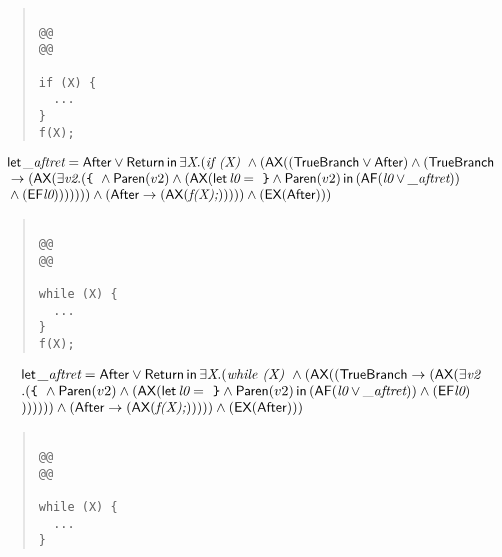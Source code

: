 \documentclass{article}
\newcommand{\AX}{\mbox{\sf{AX}}}
\newcommand{\EX}{\mbox{\sf{EX}}}
\newcommand{\AF}{\mbox{\sf{AF}}}
\newcommand{\EF}{\mbox{\sf{EF}}}
\newcommand{\mita}[1]{\mbox{\it{{#1}}}}
\newcommand{\msf}[1]{\mbox{\sf{{#1}}}}
\newcommand{\ttlb}{\mbox{\tt \char'173}}
\newcommand{\ttrb}{\mbox{\tt \char'175}}
\begin{document}
\begin{quote}\begin{verbatim}

@@
@@

if (X) {
  ...
}
f(X);
\end{verbatim}\end{quote}

\[\begin{array}{l}
\mita{\sf{let}} \, \mita{\_aftret} = \msf{After} \vee \msf{Return} \, \mita{\sf{in}} \, \exists \mita{X} . (\mita{if (X) } \wedge (\AX((\msf{TrueBranch} \vee \msf{After}) \wedge (\msf{TrueBranch}\\\mbox{} \rightarrow (\AX(\exists \mita{v2} . (\mita{{\ttlb}
  } \wedge \msf{Paren}(v2) \wedge (\AX(\mita{\sf{let}} \, \mita{l0} = \mita{
{\ttrb}} \wedge \msf{Paren}(v2) \, \mita{\sf{in}} \, (\AF(\mita{l0} \vee \mita{\_aftret}))\\\mbox{} \wedge (\EF\mita{l0})
)))))) \wedge (\msf{After} \rightarrow (\AX(\mita{f(X);}))))) \wedge (\EX(\msf{After})))

\end{array}\]

\begin{quote}\begin{verbatim}

@@
@@

while (X) {
  ...
}
f(X);
\end{verbatim}\end{quote}

\[\begin{array}{l}
\mita{\sf{let}} \, \mita{\_aftret} = \msf{After} \vee \msf{Return} \, \mita{\sf{in}} \, \exists \mita{X} . (\mita{while (X) } \wedge (\AX((\msf{TrueBranch} \rightarrow (\AX(\exists \mita{v2}\\\mbox{} . (\mita{{\ttlb}
  } \wedge \msf{Paren}(v2) \wedge (\AX(\mita{\sf{let}} \, \mita{l0} = \mita{
{\ttrb}} \wedge \msf{Paren}(v2) \, \mita{\sf{in}} \, (\AF(\mita{l0} \vee \mita{\_aftret})) \wedge (\EF\mita{l0})\\\mbox{}
)))))) \wedge (\msf{After} \rightarrow (\AX(\mita{f(X);}))))) \wedge (\EX(\msf{After})))

\end{array}\]

\begin{quote}\begin{verbatim}

@@
@@

while (X) {
  ...
}
\end{verbatim}\end{quote}
\end{document}
